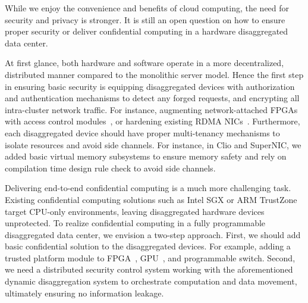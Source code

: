 While we enjoy the convenience and benefits of cloud computing, the need for security and privacy is stronger.
It is still an open question on how to ensure proper security
or deliver confidential computing in a hardware disaggregated data center.

At first glance,
both hardware and software operate in a more decentralized, distributed manner
compared to the monolithic server model.
%
Hence the first step in ensuring basic security is
equipping disaggregated devices with authorization and authentication mechanisms to detect any forged requests,
and encrypting all intra-cluster network traffic.
%
For instance, augmenting network-attached FPGAs with access control modules~\cite{nmu-fpga19}, or hardening existing RDMA NICs~\cite{ReDMArk-security21,1RMA,sRDMA-ATC20}.
%
Furthermore, each disaggregated device should have proper multi-tenancy mechanisms 
to isolate resources and avoid side channels.
For instance, in Clio and SuperNIC, we added basic virtual memory subsystems to ensure memory safety
and rely on compilation time design rule check to avoid side channels.

Delivering end-to-end confidential computing is a much more challenging task.
Existing confidential computing solutions such as Intel
SGX or ARM TrustZone target CPU-only environments,
leaving disaggregated hardware devices unprotected.
To realize confidential computing in a fully programmable disaggregated data center,
we envision a two-step approach.
First, we should add basic confidential solution to the disaggregated devices.
For example, adding a trusted platform module to FPGA~\cite{AccGuard}, GPU~\cite{Telekine}, and programmable switch.
Second, we need a distributed security control system working with the
aforementioned dynamic disaggregation system to orchestrate computation and data movement,
ultimately ensuring no information leakage.
